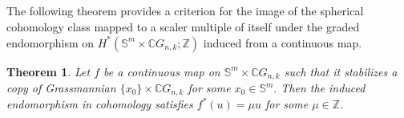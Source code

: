\documentclass{amsart}
\newtheorem{theorem}{Theorem}[section]
\begin{document}
	\subsection{} The following theorem provides a %
criterion for the image of the spherical cohomology class mapped to a scaler multiple of itself under the graded endomorphism on
	$H^*(\mathbb{S}^m \times \mathbb{C}G_{n,k};\mathbb Z)$ induced from a continuous map.
	
	
	
	\begin{theorem}\label{ind from top}
		Let $f$ be a continuous map on $\mathbb S^m\times \mathbb CG_{n,k}$ such that it stabilizes a %
copy of Grassmannian %
$\{{x_0}\}\times \mathbb CG_{n,k}$ for some $x_0\in \mathbb S^m.$ Then the induced endomorphism in cohomology satisfies $f^*(u) = \mu u$ for some $\mu \in \mathbb Z$.
	\end{theorem}
	
	
	
\end{document}
